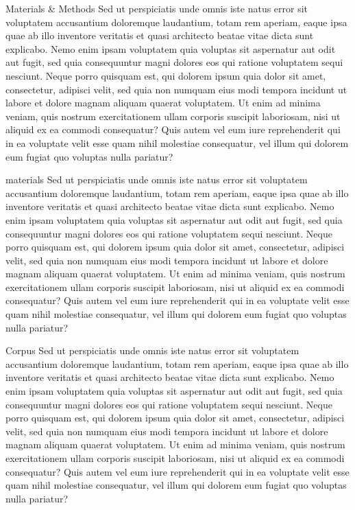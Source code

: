 \documentclass[french, english]{mythesis}
\begin{document}
		
	\begin{mychapter}{Materials \& Methods}
		Sed ut perspiciatis unde omnis iste natus error sit voluptatem accusantium doloremque laudantium, totam rem aperiam, eaque ipsa quae ab illo inventore veritatis et quasi architecto beatae vitae dicta sunt explicabo. Nemo enim ipsam voluptatem quia voluptas sit aspernatur aut odit aut fugit, sed quia consequuntur magni dolores eos qui ratione voluptatem sequi nesciunt. Neque porro quisquam est, qui dolorem ipsum quia dolor sit amet, consectetur, adipisci velit, sed quia non numquam eius modi tempora incidunt ut labore et dolore magnam aliquam quaerat voluptatem. Ut enim ad minima veniam, quis nostrum exercitationem ullam corporis suscipit laboriosam, nisi ut aliquid ex ea commodi consequatur? Quis autem vel eum iure reprehenderit qui in ea voluptate velit esse quam nihil molestiae consequatur, vel illum qui dolorem eum fugiat quo voluptas nulla pariatur?
	\begin{mysection}{materials}
		Sed ut perspiciatis unde omnis iste natus error sit voluptatem accusantium doloremque laudantium, totam rem aperiam, eaque ipsa quae ab illo inventore veritatis et quasi architecto beatae vitae dicta sunt explicabo. Nemo enim ipsam voluptatem quia voluptas sit aspernatur aut odit aut fugit, sed quia consequuntur magni dolores eos qui ratione voluptatem sequi nesciunt. Neque porro quisquam est, qui dolorem ipsum quia dolor sit amet, consectetur, adipisci velit, sed quia non numquam eius modi tempora incidunt ut labore et dolore magnam aliquam quaerat voluptatem. Ut enim ad minima veniam, quis nostrum exercitationem ullam corporis suscipit laboriosam, nisi ut aliquid ex ea commodi consequatur? Quis autem vel eum iure reprehenderit qui in ea voluptate velit esse quam nihil molestiae consequatur, vel illum qui dolorem eum fugiat quo voluptas nulla pariatur?
	\begin{mysubsection}{Corpus}
		Sed ut perspiciatis unde omnis iste natus error sit voluptatem accusantium doloremque laudantium, totam rem aperiam, eaque ipsa quae ab illo inventore veritatis et quasi architecto beatae vitae dicta sunt explicabo. Nemo enim ipsam voluptatem quia voluptas sit aspernatur aut odit aut fugit, sed quia consequuntur magni dolores eos qui ratione voluptatem sequi nesciunt. Neque porro quisquam est, qui dolorem ipsum quia dolor sit amet, consectetur, adipisci velit, sed quia non numquam eius modi tempora incidunt ut labore et dolore magnam aliquam quaerat voluptatem. Ut enim ad minima veniam, quis nostrum exercitationem ullam corporis suscipit laboriosam, nisi ut aliquid ex ea commodi consequatur? Quis autem vel eum iure reprehenderit qui in ea voluptate velit esse quam nihil molestiae consequatur, vel illum qui dolorem eum fugiat quo voluptas nulla pariatur?

\end{mysubsection}
\end{mysection}
\end{mychapter}
\end{document}
